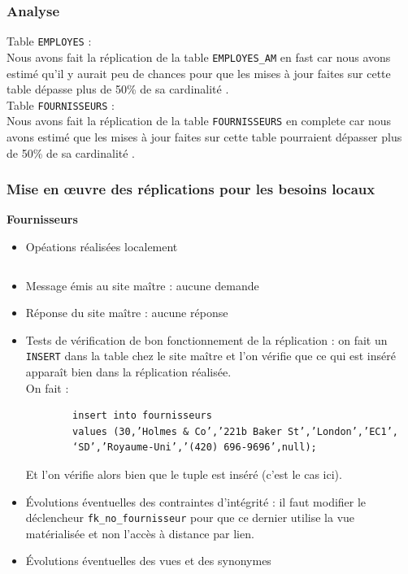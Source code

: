 \documentclass[10pt,a4paper]{article}
\theoremstyle{plain}
\begin{document}
\subsubsection{Analyse}
Table \verb|EMPLOYES| :\\
Nous avons fait la réplication de la table \verb|EMPLOYES_AM| en fast  car nous avons estimé qu’il y aurait peu de chances pour que les mises à jour faites sur cette table dépasse plus de 50\% de sa cardinalité .\\

Table \verb|FOURNISSEURS| :\\
Nous avons fait la réplication de la table \verb|FOURNISSEURS| en complete car nous avons estimé que les mises à jour faites sur cette table pourraient dépasser plus de 50\% de sa cardinalité .


\subsubsection{Mise en \oe uvre des réplications pour les besoins locaux}
\textbf{Fournisseurs}
\begin{itemize}
    \item Opéations réalisées localement
    \inputminted{sql}{EUS_V-A-5-a1.sql}
    \item Message émis au site maître : aucune demande
    \item Réponse du site maître : aucune réponse
    \item Tests de vérification de bon fonctionnement de la réplication : on fait un \verb|INSERT| dans la table chez le site maître et l'on vérifie que ce qui est inséré apparaît bien dans la réplication réalisée.\\
    On fait : 
    \begin{verbatim}
    	insert into fournisseurs
    	values (30,’Holmes & Co’,’221b Baker St’,’London’,’EC1’,
    	‘SD’,’Royaume-Uni’,’(420) 696-9696’,null);
    \end{verbatim}
   	Et l'on vérifie alors bien que le tuple est inséré (c'est le cas ici).
    
    \item Évolutions éventuelles des contraintes d'intégrité : il faut modifier le déclencheur \verb|fk_no_fournisseur| pour que ce dernier utilise la vue matérialisée et non l'accès à distance par lien.
    \item Évolutions éventuelles des vues et des synonymes
\end{itemize}
\end{document}
